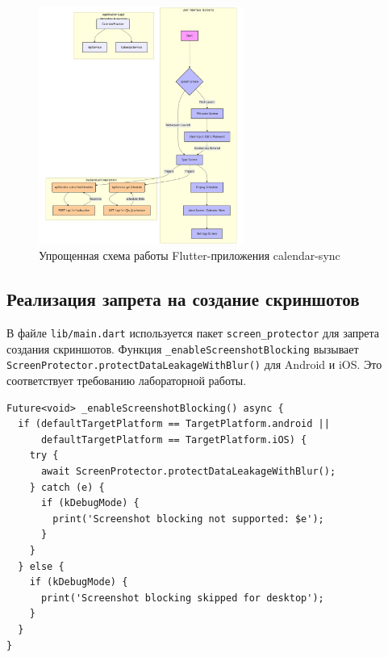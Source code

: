 \begin{figure}[h!]
    \centering
    \caption{Упрощенная схема работы Flutter-приложения calendar-sync}
    \label{fig:flutter-flow}
    \includegraphics[width=0.6\textwidth]{images/mermaid-3.png}
\end{figure}

\subsection{Реализация запрета на создание скриншотов}
В файле \texttt{lib/main.dart} используется пакет \texttt{screen\_protector} для запрета создания скриншотов. Функция \texttt{\_enableScreenshotBlocking} вызывает \texttt{ScreenProtector.protectDataLeakageWithBlur()} для Android и iOS. Это соответствует требованию лабораторной работы.

\begin{verbatim}
Future<void> _enableScreenshotBlocking() async {
  if (defaultTargetPlatform == TargetPlatform.android || 
      defaultTargetPlatform == TargetPlatform.iOS) {
    try {
      await ScreenProtector.protectDataLeakageWithBlur();
    } catch (e) {
      if (kDebugMode) {
        print('Screenshot blocking not supported: $e');
      }
    }
  } else {
    if (kDebugMode) {
      print('Screenshot blocking skipped for desktop');
    }
  }
}
\end{verbatim}

